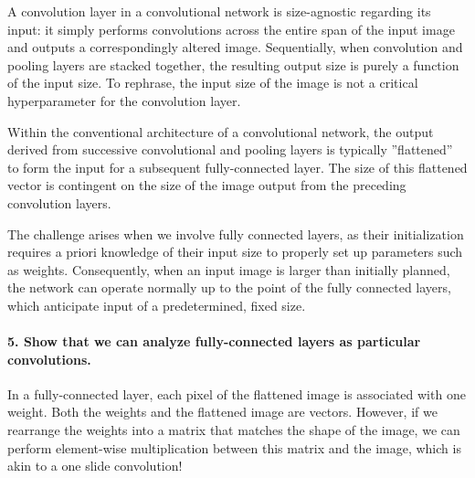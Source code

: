 

A convolution layer in a convolutional network is size-agnostic regarding its input: it simply performs convolutions across the entire span of the input image and outputs a correspondingly altered image. Sequentially, when convolution and pooling layers are stacked together, the resulting output size is purely a function of the input size. To rephrase, the input size of the image is not a critical hyperparameter for the convolution layer.

Within the conventional architecture of a convolutional network, the output derived from successive convolutional and pooling layers is typically ''flattened'' to form the input for a subsequent fully-connected layer. The size of this flattened vector is contingent on the size of the image output from the preceding convolution layers.

The challenge arises when we involve fully connected layers, as their initialization requires a priori knowledge of their input size to properly set up parameters such as weights. Consequently, when an input image is larger than initially planned, the network can operate normally up to the point of the fully connected layers, which anticipate input of a predetermined, fixed size.

\paragraph{5. Show that we can analyze fully-connected layers as particular convolutions.}
In a fully-connected layer, each pixel of the flattened image is associated with one weight. Both the weights and the flattened image are vectors. However, if we rearrange the weights into a matrix that matches the shape of the image, we can perform element-wise multiplication between this matrix and the image, which is akin to a one slide convolution!

